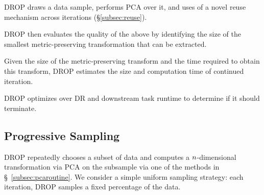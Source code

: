 


\noindent DROP draws a data sample, performs PCA over it, and uses of a novel reuse mechanism across iterations (\S\ref{subsec:reuse}).


\noindent DROP then evaluates the quality of the above by identifying the size of the smallest metric-preserving transformation that can be extracted. 


\noindent Given the size of the metric-preserving transform and the time required to obtain this transform, DROP estimates the size and computation time of continued iteration.


\noindent DROP optimizes over DR and downstream task runtime to determine if it should terminate.

\subsection{Progressive Sampling}
\label{subsec:psample}
DROP repeatedly chooses a subset of data and computes a ${\color{black}n}$-dimensional transformation via PCA on the subsample via one of the methods in \S~\ref{subsec:pcaroutine}.
We consider a simple uniform sampling strategy: each iteration, DROP samples a fixed percentage of the data.

